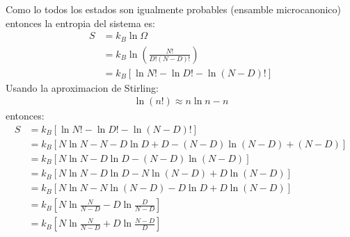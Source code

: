 \begin{answer}
    Como lo todos los estados son igualmente probables (ensamble microcanonico) entonces la entropia del sistema es:
    \begin{align*}
        S &= k_B \ln \Omega\\
        &= k_B \ln \left( \frac{N!}{D!(N-D)!} \right)\\
        &= k_B \left[
            \ln N! - \ln D! - \ln (N-D)!
        \right]
    \end{align*}
    Usando la aproximacion de Stirling:
    \begin{align*}
        \ln (n!) \approx n \ln n - n
    \end{align*}
    entonces:
    \begin{align*}
        S &= k_B \left[
            \ln N! - \ln D! - \ln (N-D)!
        \right]\\
        &= k_B \left[
            N \ln N - N - D \ln D + D - (N-D) \ln (N-D) + (N-D)
        \right]\\
        &= k_B \left[
            N \ln N - D \ln D - (N-D) \ln (N-D)
        \right]\\
        &= k_B \left[
            N \ln N - D \ln D - N \ln (N-D) + D \ln (N-D)
        \right]\\
        &= k_B \left[
            N \ln N - N \ln (N-D) - D \ln D + D \ln (N-D)
        \right]\\
        &= k_B \left[
            N \ln \frac{N}{N-D} - D \ln \frac{D}{N-D}
        \right]\\
        &= k_B \left[
            N \ln \frac{N}{N-D} + D \ln \frac{N-D}{D}
        \right]\\
    \end{align*}
\end{answer}